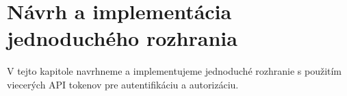 \chapter{Návrh a implementácia jednoduchého rozhrania}

\label{kap:prakticke} %

V tejto kapitole navrhneme a implementujeme jednoduché rozhranie s použitím viecerých API tokenov pre autentifikáciu a autorizáciu. 
